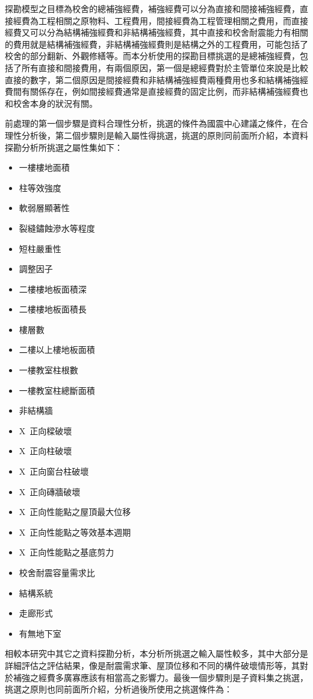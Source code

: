 探勘模型之目標為校舍的總補強經費，補強經費可以分為直接和間接補強經費，直接經費為工程相關之原物料、工程費用，間接經費為工程管理相關之費用，而直接經費又可以分為結構補強經費和非結構補強經費，其中直接和校舍耐震能力有相關的費用就是結構補強經費，非結構補強經費則是結構之外的工程費用，可能包括了校舍的部分翻新、外觀修繕等。而本分析使用的探勘目標挑選的是總補強經費，包括了所有直接和間接費用，有兩個原因，第一個是總經費對於主管單位來說是比較直接的數字，第二個原因是間接經費和非結構補強經費兩種費用也多和結構補強經費間有關係存在，例如間接經費通常是直接經費的固定比例，而非結構補強經費也和校舍本身的狀況有關。

前處理的第一個步驟是資料合理性分析，挑選的條件為國震中心建議之條件，在合理性分析後，第二個步驟則是輸入屬性得挑選，挑選的原則同前面所介紹，本資料探勘分析所挑選之屬性集如下：

\begin{multicols}{2}
\begin{itemize}
\item 一樓樓地面積
\item 柱等效強度
\item 軟弱層顯著性
\item 裂縫鏽蝕滲水等程度
\item 短柱嚴重性
\item 調整因子
\item 二樓樓地板面積深
\item 二樓樓地板面積長
\item 樓層數
\item 二樓以上樓地板面積
\item 一樓教室柱根數
\item 一樓教室柱總斷面積
\item 非結構牆
\item X~正向樑破壞
\item X~正向柱破壞
\item X~正向窗台柱破壞
\item X~正向磚牆破壞
\item X~正向性能點之屋頂最大位移
\item X~正向性能點之等效基本週期
\item X~正向性能點之基底剪力
\item 校舍耐震容量需求比
\item 結構系統
\item 走廊形式
\item 有無地下室
\end{itemize}
\end{multicols}

相較本研究中其它之資料探勘分析，本分析所挑選之輸入屬性較多，其中大部分是詳細評估之評估結果，像是耐震需求筆、屋頂位移和不同的構件破壞情形等，其對於補強之經費多廣寡應該有相當高之影響力。最後一個步驟則是子資料集之挑選，挑選之原則也同前面所介紹，分析過後所使用之挑選條件為：

